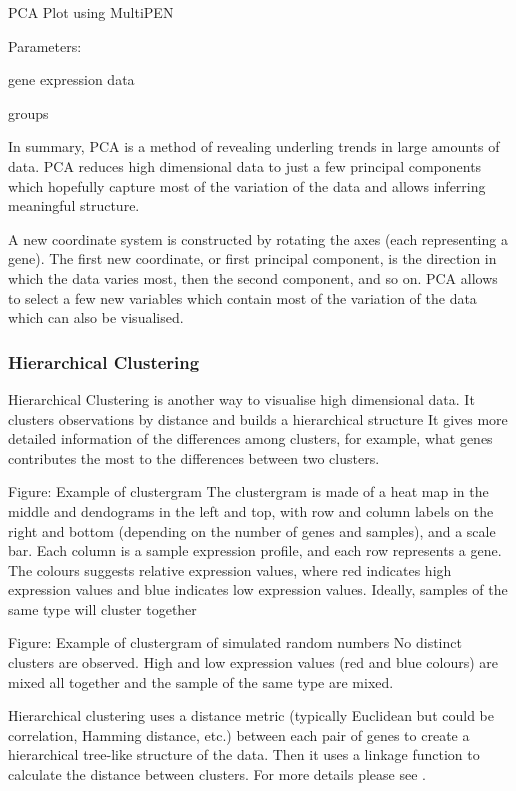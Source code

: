 \documentclass[11pt, oneside]{article}   	%
\begin{document}
PCA Plot using MultiPEN

Parameters:

gene expression data

groups



In summary, PCA is a method of revealing underling trends in large amounts of data. PCA reduces high dimensional data to just a few principal components which hopefully capture most of the variation of the data and allows inferring meaningful structure.

A new coordinate system is constructed by rotating the axes (each representing a gene). The first new coordinate, or first principal component, is the direction in which the data varies most, then the second component, and so on. PCA allows to select a few new variables which contain most of the variation of the data which can also be visualised.


\subsubsection{Hierarchical Clustering}

Hierarchical Clustering is another way to visualise high dimensional data. 
It clusters observations by distance and builds a hierarchical structure 
It gives more detailed information of the differences among clusters, for example, what genes contributes the most to the differences between two clusters.

Figure: Example of clustergram
The clustergram is made of a heat map in the middle and dendograms in the left and top, with row and column labels on the right and bottom (depending on the number of genes and samples), and a scale bar. 
Each column is a sample expression profile, and each row represents a gene.
The colours suggests relative expression values, where red indicates high expression values and blue indicates low expression values. Ideally, samples of the same type will cluster together


Figure: Example of clustergram of simulated random numbers
No distinct clusters are observed. High and low expression values (red and blue colours) are mixed all together and the sample of the same type are mixed.


Hierarchical clustering uses a distance metric (typically Euclidean but could be correlation, Hamming distance, etc.) between each pair of genes to create a hierarchical tree-like structure of the data. Then it uses a linkage function to calculate the distance between clusters. For more details please see \cite{Clustergram}. 
\end{document}

